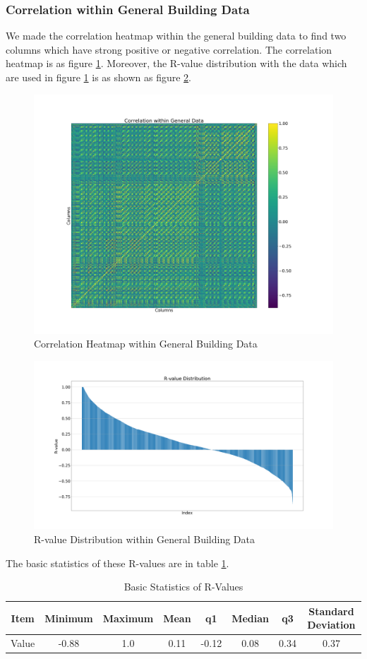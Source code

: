 \documentclass[aps, 10pt, a4paper]{article}
\begin{document}
            \subsubsection{Correlation within General Building Data} 
                We made the correlation heatmap within the general building data to find two columns which have strong positive or negative correlation. The correlation heatmap is as figure \ref{fig:correlationgeneral}. Moreover, the R-value distribution with the data which are used in figure \ref{fig:correlationgeneral} is as shown as figure \ref{fig:rgeneral}.
                
                \begin{figure}[htbp]
                    \centering
                    \includegraphics[width=0.4 \linewidth]{figures/correlationgeneral.png}
                    \caption{Correlation Heatmap within General Building Data}
                    \label{fig:correlationgeneral}
                \end{figure}
            
                \begin{figure}[htbp]
                    \centering
                    \includegraphics[width=0.5 \linewidth]{figures/rgeneral.png}
                    \caption{R-value Distribution within General Building Data}
                    \label{fig:rgeneral}
                \end{figure}
            
                The basic statistics of these R-values are in table \ref{tb:rgeneral}.
                
                \begin{table}[htbp]
                    \centering
                    \caption{Basic Statistics of R-Values}
                    \label{tb:rgeneral}
                    \begin{tabular}{c||c|c|c|c|c|c|c}
                        Item & Minimum & Maximum & Mean & q1 & Median & q3 & Standard Deviation \\ \hline
                        Value & -0.88 & 1.0 & 0.11 & -0.12 & 0.08 & 0.34 & 0.37 \\
                    \end{tabular}
                \end{table}
            
\end{document}
